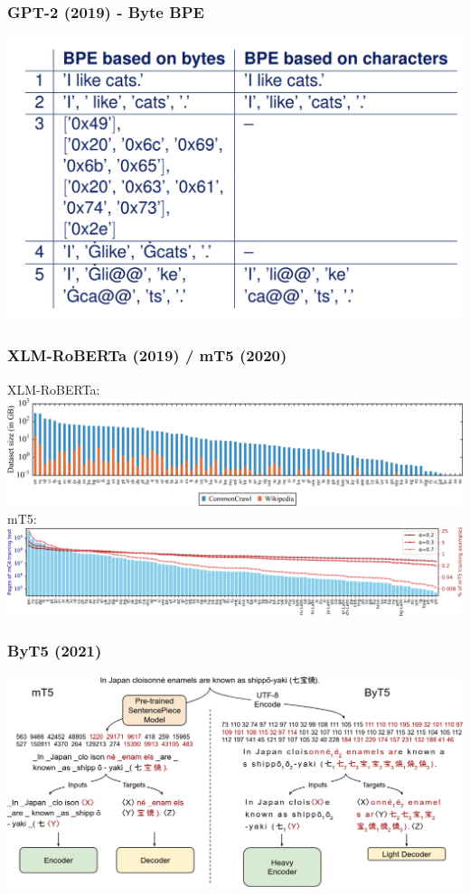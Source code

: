 \documentclass{beamer}
\begin{document}
\begin{frame}
    \frametitle{GPT-2 (2019) \cite{gpt2} - Byte BPE}
    \begin{center}
        \includegraphics[scale=0.25]{img/byte-bpe-1.png}
    \end{center}
\end{frame}

\begin{frame}
    \frametitle{XLM-RoBERTa (2019) \cite{xlmr} / mT5 (2020) \cite{mt5}}
    \begin{center}
        XLM-RoBERTa:
        \includegraphics[scale=0.8]{img/xlmr.png}
        mT5:
        \includegraphics[scale=0.75]{img/mt5.png}
    \end{center}
\end{frame}

\begin{frame}
    \frametitle{ByT5 (2021) \cite{byt5}}
    \begin{center}
        \includegraphics[scale=1.0]{img/mt5_and_byt5.png}
    \end{center}
\end{frame}
\end{document}
